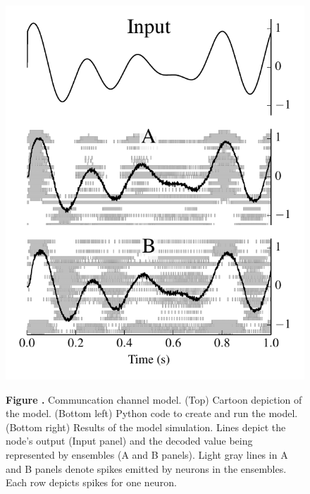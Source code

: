 \documentclass{frontiersSCNS}
\begin{document}
\begin{figure}
\begin{center}
\begin{minipage}{0.37\textwidth}
    \includegraphics[width=\textwidth]{comm_channel_res}
  \end{minipage}
\end{center}
 \textbf{\label{fig:cchannel} Figure .}{
   Communcation channel model. (Top) Cartoon depiction of the model.
   (Bottom left) Python code to create and run the model.
   (Bottom right) Results of the model simulation. Lines depict
   the node's output (Input panel) and the decoded value being represented
   by ensembles (A and B panels). Light gray lines in A and B panels denote
   spikes emitted by neurons in the ensembles. Each row depicts spikes
   for one neuron.}
\end{figure}
\end{document}
